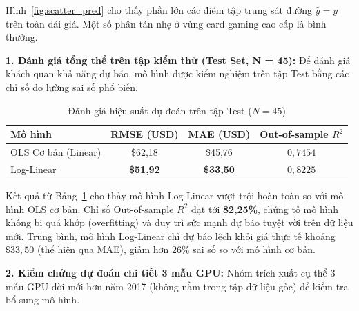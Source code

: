 Hình~\ref{fig:scatter_pred} cho thấy phần lớn các điểm tập trung sát đường $\hat{y} = y$ trên toàn dải giá. Một số phân tán nhẹ ở vùng card gaming cao cấp là bình thường.

\textbf{1. Đánh giá tổng thể trên tập kiểm thử (Test Set, N = 45):}
Để đánh giá khách quan khả năng dự báo, mô hình được kiểm nghiệm trên tập Test bằng các chỉ số đo lường sai số phổ biến.

\begin{table}[H]
\centering
\caption{Đánh giá hiệu suất dự đoán trên tập Test ($N=45$)}
\label{tab:test_metrics}
\begin{tabular}{|l|c|c|c|}
\hline
\textbf{Mô hình} & \textbf{RMSE (USD)} & \textbf{MAE (USD)} & \textbf{Out-of-sample $R^2$} \\
\hline
OLS Cơ bản (Linear) & \$62,18 & \$45,76 & $0{,}7454$ \\
Log-Linear & \textbf{\$51,92} & \textbf{\$33,50} & \textbf{$0{,}8225$} \\
\hline
\end{tabular}
\end{table}

Kết quả từ Bảng~\ref{tab:test_metrics} cho thấy mô hình Log-Linear vượt trội hoàn toàn so với mô hình OLS cơ bản. Chỉ số Out-of-sample $R^2$ đạt tới \textbf{82,25\%}, chứng tỏ mô hình không bị quá khớp (overfitting) và duy trì sức mạnh dự báo tuyệt vời trên dữ liệu mới. Trung bình, mô hình Log-Linear chỉ dự báo lệch khỏi giá thực tế khoảng $\$33{,}50$ (thể hiện qua MAE), giảm hơn $26\%$ sai số so với mô hình cơ bản.

\textbf{2. Kiểm chứng dự đoán chi tiết 3 mẫu GPU:} Nhóm trích xuất cụ thể 3 mẫu GPU đời mới hơn năm 2017 (không nằm trong tập dữ liệu gốc) để kiểm tra bổ sung mô hình.

\begin{table}[H]
\centering
\caption{Dự đoán giá trị thực tế cho 3 mẫu GPU hoàn toàn không nằm trong dữ liệu}
\label{tab:out_of_sample}
\end{table}

